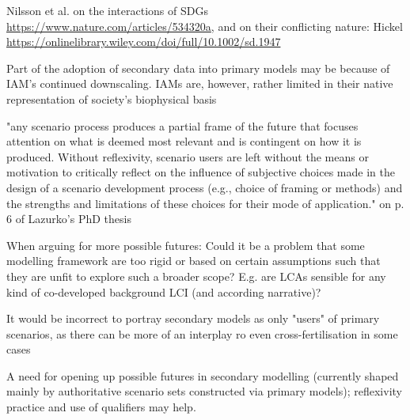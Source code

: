 \documentclass{article}
\begin{document}
Nilsson et al. on the interactions of SDGs \url{https://www.nature.com/articles/534320a}, and on their conflicting nature: Hickel \url{https://onlinelibrary.wiley.com/doi/full/10.1002/sd.1947}

Part of the adoption of secondary data into primary models may be because of IAM's continued downscaling. IAMs are, however, rather limited in their native representation of society's biophysical basis

"any scenario process produces a partial frame of the future that focuses attention on what is deemed most relevant and is contingent on how it is produced. Without reflexivity, scenario users are left without the means or motivation to critically reflect on the influence of subjective choices made in the design of a scenario development process (e.g., choice of framing or methods) and the strengths and limitations of these choices for their mode of application." on p. 6 of Lazurko's PhD thesis

When arguing for more possible futures: Could it be a problem that some modelling framework are too rigid or based on certain assumptions such that they are unfit to explore such a broader scope? E.g. are LCAs sensible for any kind of co-developed background LCI (and according narrative)?

It would be incorrect to portray secondary models as only "users" of primary scenarios, as there can be more of an interplay ro even cross-fertilisation in some cases

A need for opening up possible futures in secondary modelling (currently shaped mainly by authoritative scenario sets constructed via primary models); reflexivity practice and use of qualifiers may help.
\end{document}
